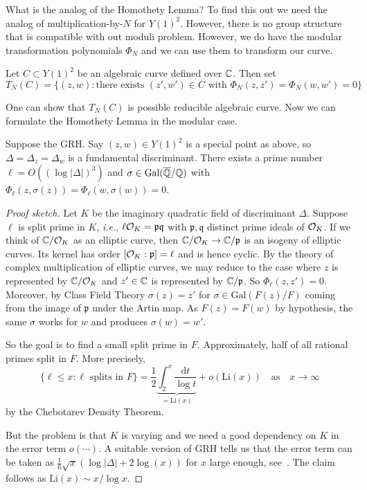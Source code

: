 What is the analog of the Homothety Lemma? To find this out we need
the analog of multiplication-by-$N$ for $Y(1)^2$. However, there is
no group structure that is compatible with out moduli problem.
However, we do have the modular transformation polynomials $\Phi_N$
and we can use them to transform our curve.

\begin{definition}
  Let $C\subset Y(1)^2$ be an algebraic curve defined over ${\mathbb{C}}$. Then set
  \begin{equation*}
    T_N(C) = \{(z,w) : \text{there exists $(z',w')\in C$ with $\Phi_N(z,z')=\Phi_N(w,w')=0$}\}
  \end{equation*}  
\end{definition}

One can show that $T_N(C)$ is possible reducible algebraic curve.
Now we can formulate the Homothety Lemma in the modular case.

\begin{lemma}
  Suppose the GRH.
  Say $(z,w)\in Y(1)^2$ is a special point as above, so %
 $\Delta=\Delta_z=\Delta_w$ is a fundamental discriminant.
  There exists a prime number $\ell=O((\log
  |\Delta|)^3)$ and $\sigma\in \mathrm{Gal}({\overline{\mathbb{Q}}}/{\mathbb{Q}})$  with $\Phi_\ell(z,\sigma(z))=\Phi_\ell(w,\sigma(w))=0$. 
\end{lemma}
\begin{proof}[Proof sketch]
  Let $K$ be the imaginary quadratic field of discriminant $\Delta$.
  Suppose $\ell$ is split prime in $K$, \textit{i.e.}, $\ell{\mathcal O}_K =
  \mathfrak{p}\mathfrak{q}$ with $  \mathfrak{p},\mathfrak{q}$
  distinct prime ideals of ${\mathcal O}_K$.
  If we think of ${\mathbb{C}}/{\mathcal O}_K$ as an elliptic curve,
  then ${\mathbb{C}}/{\mathcal O}_K \rightarrow {\mathbb{C}}/\mathfrak{p}$ is an isogeny of
  elliptic curves. Its kernel has order $[{\mathcal O}_K:\mathfrak{p}]=\ell$
  and is hence cyclic. By the theory of complex multiplication of
  elliptic curves, we may reduce to the case where $z$ is
  represented by ${\mathbb{C}}/{\mathcal O}_K$ and $z'\in {\mathbb{C}}$ is represented by
  ${\mathbb{C}}/\mathfrak{p}$. So $\Phi_{\ell}(z,z')=0$. 
  Moreover, by Class Field Theory $\sigma(z)=z'$ for $\sigma \in
  \mathrm{Gal}(F(z)/F)$ coming from the image of $\mathfrak{p}$ under
  the Artin map. As $F(z)=F(w)$ by hypothesis, the same $\sigma$ works
  for $w$ and produces $\sigma(w)=w'$.

  So the goal is to find a small split prime in $F$. Approximately,
  half of all rational primes split in $F$. More precisely,
  \begin{equation*}
    \{\ell \le x : \ell \text{ splits in }F\} = \frac 12 \underbrace{\int_2^x
      \frac{\mathrm{d} t}{\log t}}_{=\mathrm{Li}(x)} + o(\mathrm{Li}(x))
    \quad\text{as}\quad x\rightarrow\infty
  \end{equation*}
  by the Chebotarev Density Theorem.

  But the problem is that $K$ is
  varying and we need a good dependency on $K$ in the error term
  $o(\cdots)$.
  A suitable version of GRH tells us that the error term can be taken
  as
  $\frac 16 \sqrt x (\log|\Delta| + 2\log(x))$ for $x$ large enough,
  see~\cite{Serre:chebotareveff}. 
  The claim follows as $\mathrm{Li}(x)\sim x/\log x$. 
\end{proof}

